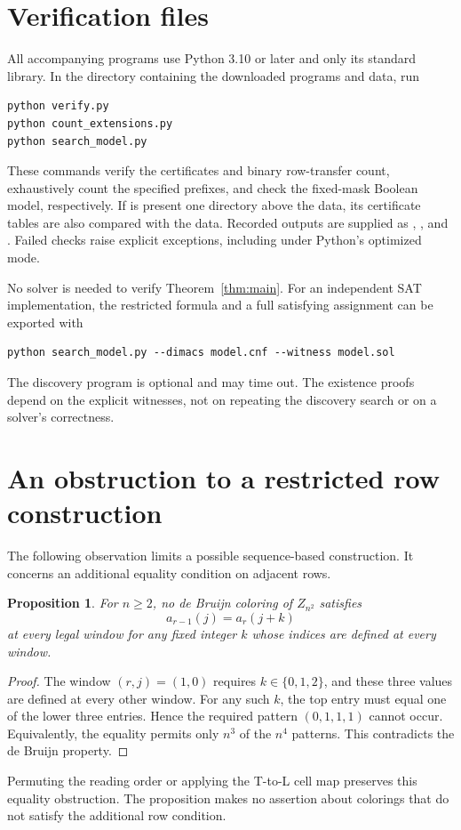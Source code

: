 \documentclass[11pt]{article}
\newtheorem{proposition}{Proposition}
\begin{document}
\appendix
\small
\section{Verification files}
All accompanying programs use Python 3.10 or later and only its standard
library. In the directory containing the downloaded programs and data, run
\begin{verbatim}
python verify.py
python count_extensions.py
python search_model.py
\end{verbatim}
These commands verify the certificates and binary row-transfer count,
exhaustively count the specified prefixes, and check the fixed-mask
Boolean model, respectively. If  is present one directory
above the data, its certificate tables are also compared with the data.
Recorded outputs are supplied as
, , and
. Failed checks raise explicit exceptions, including
under Python's optimized mode.

No solver is needed to verify Theorem~\ref{thm:main}. For an independent
SAT implementation, the restricted formula and a full satisfying
assignment can be exported with
\begin{verbatim}
python search_model.py --dimacs model.cnf --witness model.sol
\end{verbatim}
The discovery program  is optional and may time out.
The existence proofs depend on the explicit witnesses, not on repeating
the discovery search or on a solver's correctness.

\section{An obstruction to a restricted row construction}
The following observation limits a possible sequence-based construction.
It concerns an additional equality condition on adjacent rows.

\begin{proposition}\label{prop:shift}
For $n\ge2$, no de Bruijn coloring of $Z_{n^2}$ satisfies
\[
 a_{r-1}(j)=a_r(j+k)
\]
at every legal window for any fixed integer $k$ whose indices are
defined at every window.
\end{proposition}
\begin{proof}
The window $(r,j)=(1,0)$ requires $k\in\{0,1,2\}$, and these three
values are defined at every other window. For any such $k$, the top
entry must equal one of the lower three entries. Hence the required
pattern $(0,1,1,1)$ cannot occur. Equivalently, the equality permits
only $n^3$ of the $n^4$ patterns. This contradicts the de Bruijn property.
\end{proof}
Permuting the reading order or applying the T-to-L cell map preserves
this equality obstruction. The proposition makes no assertion about
colorings that do not satisfy the additional row condition.
\end{document}

